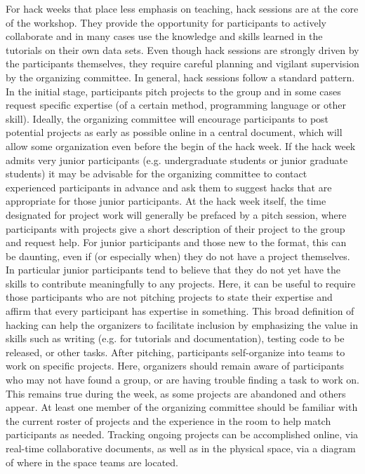 \documentclass{nature}
\begin{document}
For hack weeks that place less emphasis on teaching, hack sessions are at the core of the workshop. They provide the opportunity for participants to actively collaborate and in many cases use the knowledge and skills learned in the tutorials on their own data sets. Even though hack sessions are strongly driven by the participants themselves, they require careful planning and vigilant supervision by the organizing committee. In general, hack sessions follow a standard pattern. In the initial stage, participants pitch projects to the group and in some cases request specific expertise (of a certain method, programming language or other skill). Ideally, the organizing committee will encourage participants to post potential projects as early as possible online in a central document, which will allow some organization even before the begin of the hack week. If the hack week admits very junior participants (e.g. undergraduate students or junior graduate students) it may be advisable for the organizing committee to contact experienced participants in advance and ask them to suggest hacks that are appropriate for those junior participants.
At the hack week itself, the time designated for project work will generally be prefaced by a pitch session, where participants with projects give a short description of their project to the group and request help. For junior participants and those new to the format, this can be daunting, even if (or especially when) they do not have a project themselves. In particular junior participants tend to believe that they do not yet have the skills to contribute meaningfully to any projects. Here, it can be useful to require those participants who are not pitching projects to state their expertise and affirm that every participant has expertise in something. This broad definition of hacking can help the organizers to facilitate inclusion by emphasizing the value in skills such as writing (e.g. for tutorials and documentation), testing code to be released, or other tasks. After pitching, participants self-organize into teams to work on specific projects. Here, organizers should remain aware of participants who may not have found a group, or are having trouble finding a task to work on. This remains true during the week, as some projects are abandoned and others appear. At least one member of the organizing committee should be familiar with the current roster of projects and the experience in the room to help match participants as needed. Tracking ongoing projects can be accomplished online, via real-time collaborative documents, as well as in the physical space, via a diagram of where in the space teams are located.
\end{document}
